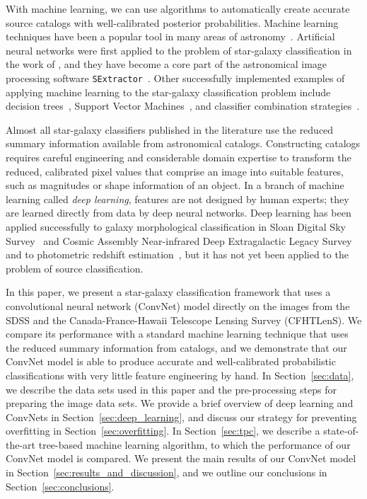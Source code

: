\documentclass[fleqn,usenatbib]{mnras}
\begin{document}
With machine learning, we can use algorithms to automatically create
accurate source catalogs with well-calibrated posterior probabilities.
Machine learning techniques have been a popular tool
in many areas of astronomy~\citep{ball2007robust,ball2008robust,
banerji2010galaxy,
carrascokind2013tpz,carrascokind2014somz,carrascokind2014exhausting,
ivezic2014statistics,
kamdar2016machine1,kamdar2016machine2}. 
Artificial neural networks were first applied to the problem of star-galaxy
classification in the work of \citet{odewahn1992automated},
and they have become a core part of the astronomical image processing software
\texttt{SExtractor}~\citep{bertin1996sextractor}.
Other successfully implemented examples of applying machine learning to
the star-galaxy classification problem include decision 
trees~\citep{weir1995automated,suchkov2005census,ball2006robust,sevilla2015effect}, 
Support Vector Machines~\citep{Fadely2012}, and
classifier combination strategies~\citep{kim2015hybrid}.

Almost all star-galaxy classifiers published in the literature use
the reduced summary information available from astronomical catalogs.
Constructing catalogs requires careful engineering and considerable domain expertise
to transform the reduced, calibrated pixel values that comprise an image into suitable features,
such as magnitudes or shape information of an object.
In a branch of machine learning called \textit{deep learning},
features are not designed by human experts;
they are learned directly from data by deep neural networks.
Deep learning has been applied successfully to galaxy morphological
classification in Sloan Digital Sky Survey~\citep[SDSS;][]{dieleman2015rotation}
and Cosmic Assembly Near-infrared Deep Extragalactic Legacy
Survey~\citep[CANDELS;][]{huertas2015catalog} and to photometric redshift
estimation~\citep{hoyle2015measuring},
but it has not yet been applied to the problem of source classification.

In this paper, we present a star-galaxy classification framework
that uses a convolutional neural network (ConvNet) model directly on the images
from the SDSS and the Canada-France-Hawaii Telescope Lensing Survey (CFHTLenS).
We compare its performance with a standard machine learning technique
that uses the reduced summary information from catalogs,
and we demonstrate that our ConvNet model is able to produce accurate and
well-calibrated probabilistic classifications with very little feature
engineering by hand.
In Section~\ref{sec:data}, we describe the data sets used in this paper
and the pre-processing steps for preparing the image data sets.
We provide a brief overview of deep learning and ConvNets
in Section~\ref{sec:deep_learning}, and
discuss our strategy for preventing overfitting in Section~\ref{sec:overfitting}.
In Section~\ref{sec:tpc}, we describe a state-of-the-art tree-based
machine learning algorithm, to which the performance of our ConvNet model is
compared.
We present the main results of our ConvNet model in
Section~\ref{sec:results_and_discussion}, and
we outline our conclusions in Section~\ref{sec:conclusions}.
\end{document}
